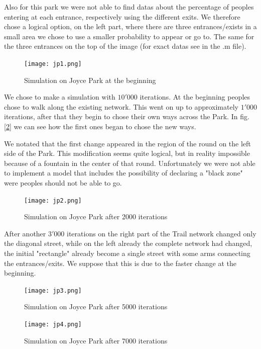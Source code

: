 \documentclass[11pt]{article}
\begin{document}
Also for this park we were not able to find datas about the percentage of peoples entering at each entrance, respectively using the different exits. We therefore chose a logical option, on the left part, where there are three entrances/exists in a small area we chose to use a smaller probability to appear or go to. The same for the three entrances on the top of the image (for exact datas see in the .m file). 

\begin{figure}[H]
        \centering
        \texttt{[image: jp1.png]}
        \caption{Simulation on Joyce Park at the beginning}
        \label{jp1}
\end{figure}

We chose to make a simulation with $10'000$ iterations. 
At the beginning peoples chose to walk along the existing network. This went on up to approximately $1'000$ iterations, after that they begin to chose their own ways across the Park. In fig. [\ref{jp2}] we can see how the first ones began to chose the new ways. 

We notated that the first change appeared in the region of the round on the left side of the Park. This modification seems quite logical, but in reality impossible because of a fountain in the center of that round. Unfortunately we were not able to implement a model that includes the possibility of declaring a "black zone" were peoples should not be able to go. 

\begin{figure}[H]
        \centering
        \texttt{[image: jp2.png]}
        \caption{Simulation on Joyce Park after 2000 iterations}
        \label{jp2}
\end{figure}

After another $3'000$ iterations on the right part of the Trail network changed only the diagonal street, while on the left already the complete network had changed, the initial "rectangle" already become a single street with some arms connecting the entrances/exits. We suppose that this is due to the faster change at the beginning. 

\begin{figure}[H]
        \centering
        \texttt{[image: jp3.png]}
        \caption{Simulation on Joyce Park after 5000 iterations}
        \label{jp3}
\end{figure}

\begin{figure}[H]
        \centering
        \texttt{[image: jp4.png]}
        \caption{Simulation on Joyce Park after 7000 iterations}
        \label{jp4}
\end{figure}
\end{document}
